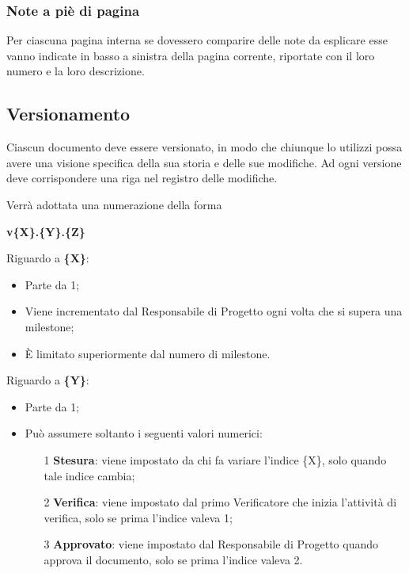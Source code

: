 	\subsubsection{Note a piè di pagina}
	
	Per ciascuna pagina interna se dovessero comparire delle note da esplicare esse vanno indicate in basso a sinistra della pagina corrente, riportate con il loro numero e la loro descrizione.

\subsection{Versionamento}

Ciascun documento deve essere versionato, in modo che chiunque lo utilizzi possa avere una visione specifica della sua storia e delle sue modifiche. Ad ogni versione deve corrispondere una riga nel registro delle modifiche.

Verrà adottata una numerazione della forma
\begin{center}
 \textbf{v\{X\}.\{Y\}.\{Z\}}
\end{center}

Riguardo a \textbf{\{X\}}:
\begin{itemize}
 \item Parte da 1;
 \item Viene incrementato dal Responsabile di Progetto ogni volta che si supera una milestone;
 \item È limitato superiormente dal numero di milestone.
\end{itemize}

Riguardo a \textbf{\{Y\}}:
\begin{itemize}
 \item Parte da 1;
 \item Può assumere soltanto i seguenti valori numerici:
 \begin{enumerate}
  \item[1] \textbf{Stesura}: viene impostato da chi fa variare l'indice \{X\}, solo quando tale indice cambia;
  \item[2] \textbf{Verifica}: viene impostato dal primo Verificatore che inizia l'attività di verifica, solo se prima l'indice valeva 1;
  \item[3] \textbf{Approvato}: viene impostato dal Responsabile di Progetto quando approva il documento, solo se prima l'indice valeva 2.
 \end{enumerate}
\end{itemize}

